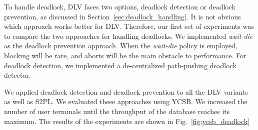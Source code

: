 \documentclass[conference]{IEEEtran}
\begin{document}
To handle deadlock, DLV faces two options, deadlock detection or deadlock prevention, as discussed in Section~\ref{sec:deadlock_handling}.
It is not obvious which approach works better for DLV. 
Therefore, our first set of experiments was to compare the two approaches for handling deadlocks.
We implemented \emph{wait-die} as the deadlock prevention approach.
When the \emph{wait-die} policy is employed, blocking will be rare, and aborts will be the main obstacle to performance.
For deadlock detection, we implemented a de-centralized path-pushing deadlock detector\cite{Deadlock:journals/computer/Singhal89}.

We applied deadlock detection and deadlock prevention to all the DLV variants as well as S2PL. 
We evaluated these approaches using YCSB.
We increased the number of user terminals until the throughput of the database reaches its maximum.
The results of the experiments are shown in Fig.~\ref{fig:ycsb_deadlock} 
\end{document}
